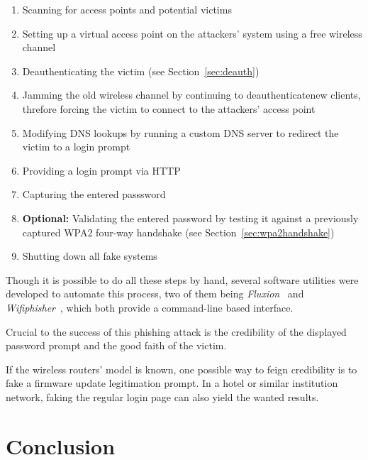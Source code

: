 \begin{enumerate}

\item{Scanning for access points and potential victims}

\item{Setting up a virtual access point on the attackers' system using a free wireless channel}

\item{Deauthenticating the victim (see Section~\ref{sec:deauth})}

\item{Jamming the old wireless channel by continuing to deauthenticatenew clients, threfore forcing the victim to connect to the attackers' access point}

\item{Modifying DNS lookups by running a custom DNS server to redirect the victim to a login prompt}

\item{Providing a login prompt via HTTP}

\item{Capturing the entered passsword}

\item{\textbf{Optional:} Validating the entered password by testing it against a previously captured WPA2 four-way handshake (see Section~\ref{sec:wpa2handshake})}

\item{Shutting down all fake systems}

\end{enumerate}

Though it is possible to do all these steps by hand, several software utilities were developed to automate this process, two of them being \emph{Fluxion}~\cite{Fluxion17} and \emph{Wifiphisher}~\cite{Wifiphisher17}, which both provide a command-line based interface.

Crucial to the success of this phishing attack is the credibility of the displayed password prompt and the good faith of the victim. 

If the wireless routers' model is known, one possible way to feign credibility is to fake a firmware update legitimation prompt. In a hotel or similar institution network, faking the regular login page can also yield the wanted results.

\section{Conclusion}


